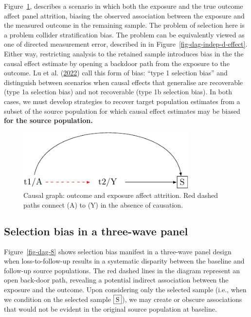 \documentclass[
  singlecolumn]{report}
\begin{document}
Figure~\ref{fig-dag-8-5}, describes a scenario in which both the
exposure and the true outcome affect panel attrition, biasing the
observed association between the exposure and the measured outcome in
the remaining sample. The problem of selection here is a problem
collider stratification bias. The problem can be equivalently viewed as
one of directed measurement error, described in in
Figure~\ref{fig-dag-indep-d-effect}. Either way, restricting analysis to
the retained sample introduces bias in the the causal effect estimate by
opening a backdoor path from the exposure to the outcome. Lu et al.
(\protect\hyperlink{ref-lu2022}{2022}) call this form of bias: ``type 1
selection bias'' and distinguish between scenarios when causal effects
that generalise are recoverable (type 1a selection bias) and not
recoverable (type 1b selection bias). In both cases, we must develop
strategies to recover target population estimates from a subset of the
source population for which causal effect estimates may be biased
\textbf{for the source population.}

\begin{figure}

{\centering \includegraphics[width=0.8\textwidth,height=\textheight]{causal-dags_files/figure-pdf/fig-dag-8-5-1.pdf}

}

\caption{\label{fig-dag-8-5}Causal graph: outcome and exposure affect
attrition. Red dashed paths connect (A) to (Y) in the absence of
causation.}

\end{figure}

\hypertarget{selection-bias-in-a-three-wave-panel}{%
\subsection{Selection bias in a three-wave
panel}\label{selection-bias-in-a-three-wave-panel}}

Figure~\ref{fig-dag-8} shows selection bias manifest in a three-wave
panel design when loss-to-follow-up results in a systematic disparity
between the baseline and follow-up source populations. The red dashed
lines in the diagram represent an open back-door path, revealing a
potential indirect association between the exposure and the outcome.
Upon considering only the selected sample (i.e., when we condition on
the selected sample \(\framebox{S}\)), we may create or obscure
associations that would not be evident in the original source population
at baseline.
\end{document}
